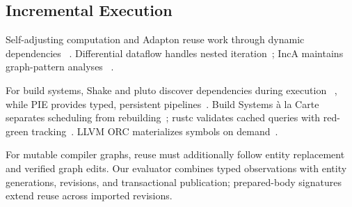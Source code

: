 \subsection{Incremental Execution}

Self-adjusting computation and Adapton reuse work through dynamic dependencies
~\cite{acar2009selfadjusting,hammer2014adapton}. Differential dataflow handles nested
iteration~\cite{mcsherry2013differential}; IncA maintains graph-pattern analyses
~\cite{szabo2016inca}.

For build systems, Shake and pluto discover dependencies during execution
~\cite{mitchell2012shake,erdweg2015pluto}, while PIE provides typed, persistent
pipelines~\cite{konat2018pie}. Build Systems à la Carte separates scheduling from
rebuilding~\cite{mokhov2018build}; rustc validates cached queries with red-green
tracking~\cite{rustcincremental}. LLVM ORC materializes symbols on demand~\cite{llvmorc}.

For mutable compiler graphs, reuse must additionally follow entity replacement
and verified graph edits. Our evaluator combines typed observations with entity
generations, revisions, and transactional publication; prepared-body signatures
extend reuse across imported revisions.
